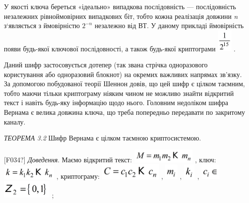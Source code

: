 У якості ключа береться «ідеально» випадкова послідовність --- послідовність
незалежних рівноймовірних випадкових біт, тобто кожна реалізація довжини 
\textit{n }з‘являється з ймовірністю  ${2^{{-n}}}$ незалежно від ВТ. У даному
прикладі ймовірність появи будь-якої ключової послідовності, а також будь-якої
криптограми  
\includegraphics[width=0.2917in,height=0.4437in]{crypt-img/crypt-img26.png} .

Даний шифр застосовується дотепер (так звана стрічка одноразового користування
або одноразовий блокнот) на окремих важливих напрямах зв’язку. За допомогою
побудованої теорії Шеннон  довів, що цей шифр  є цілком таємним, тобто маючи
тільки криптограму  ніяким чином не можливо знайти відкритий текст і навіть
будь-яку інформацію щодо нього. Головним недоліком шифра Вернама є велика
довжина ключа, що треба попередньо передавати по закритому каналу. 


\bigskip

\textit{ТЕОРЕМА }\textit{3}\textit{.2  }Шифр Вернама є цілком таємною
криптосистемою.

\textlatin{[F034?]} \textit{Доведення}. Маємо відкритий текст: 
\includegraphics[width=1.2591in,height=0.2709in]{crypt-img/crypt-img27.png} ,
ключ: 
\includegraphics[width=1.0827in,height=0.2791in]{crypt-img/crypt-img28.png} ,
криптограму: 
\includegraphics[width=1.2283in,height=0.3146in]{crypt-img/crypt-img29.png} , 
\includegraphics[width=0.2591in,height=0.3063in]{crypt-img/crypt-img30.png} , 
\includegraphics[width=0.2402in,height=0.3118in]{crypt-img/crypt-img31.png} , 
\includegraphics[width=0.3929in,height=0.3126in]{crypt-img/crypt-img32.png} 
\includegraphics[width=0.9835in,height=0.3547in]{crypt-img/crypt-img33.png} ;

